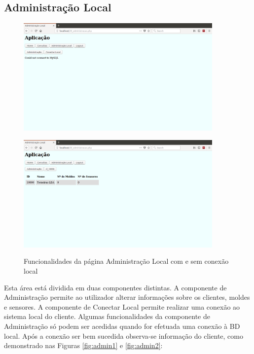 \documentclass[11pt,twoside,a4paper]{report}
\begin{document}
\subsection{Administração Local}
\begin{figure}[H]
	\centering
	\begin{minipage}{1\textwidth}
		\begin{center}
			\includegraphics[width=0.9\textwidth]{administracao01} %
			\label{fig:admin1}
		\end{center}
	\end{minipage}
	\begin{minipage}{1\textwidth}
		\begin{center}
			\includegraphics[width=0.9\textwidth]{administracao02} %
			\label{fig:admin2}
		\end{center}
	\end{minipage}
	\caption{Funcionalidades da página Administração Local com e sem conexão local}
	\label{fig:admin0}
\end{figure}
Esta área está dividida em duas componentes distintas. A componente de Administração permite ao utilizador alterar informações sobre os clientes, moldes e sensores. A componente de Conectar Local permite realizar uma conexão ao sistema local do cliente. Algumas funcionalidades da componente de Administração só podem ser acedidas quando for efetuada uma conexão à BD local. Após a conexão ser bem sucedida observa-se informação do cliente, como demonstrado nas Figuras \ref{fig:admin1} e \ref{fig:admin2}:
\end{document}
